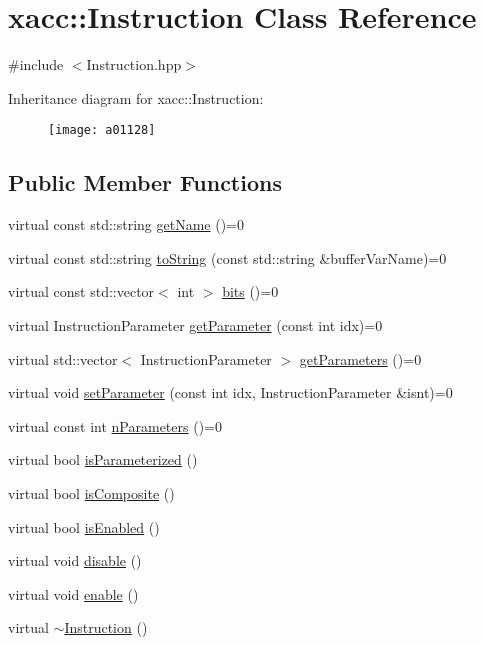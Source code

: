 \hypertarget{a01128}{}\section{xacc\+:\+:Instruction Class Reference}
\label{a01128}


{\ttfamily \#include $<$Instruction.\+hpp$>$}

Inheritance diagram for xacc\+:\+:Instruction\+:\begin{figure}[H]
\begin{center}
\leavevmode
\texttt{[image: a01128]}
\end{center}
\end{figure}
\subsection*{Public Member Functions}
\begin{DoxyCompactItemize}
\item 
virtual const std\+::string \hyperlink{a01128_ac7ff23f693e2276edbf3fdac5452792c}{get\+Name} ()=0
\item 
virtual const std\+::string \hyperlink{a01128_ae94c2d089908294c1d410b14c96817ae}{to\+String} (const std\+::string \&buffer\+Var\+Name)=0
\item 
virtual const std\+::vector$<$ int $>$ \hyperlink{a01128_a819f32e94c3e1c9e69a0061aaf8d86dc}{bits} ()=0
\item 
virtual Instruction\+Parameter \hyperlink{a01128_aa0d9de97a4833a042379647f83c33ab6}{get\+Parameter} (const int idx)=0
\item 
virtual std\+::vector$<$ Instruction\+Parameter $>$ \hyperlink{a01128_aeb67c67713896e8f27a5c7dd531f3340}{get\+Parameters} ()=0
\item 
virtual void \hyperlink{a01128_a407a0ac662fa0b1ec3e301e8ff9bade7}{set\+Parameter} (const int idx, Instruction\+Parameter \&isnt)=0
\item 
virtual const int \hyperlink{a01128_ad54585d13c04ffd20296fff7ab8107ff}{n\+Parameters} ()=0
\item 
virtual bool \hyperlink{a01128_a7b24d8ae485369fc2b2df7a3224a5e26}{is\+Parameterized} ()
\item 
virtual bool \hyperlink{a01128_a4383f1036d0fcfe890ab9c613dbd5f38}{is\+Composite} ()
\item 
virtual bool \hyperlink{a01128_ad02a1cf7220577124720b7a51424cea7}{is\+Enabled} ()
\item 
virtual void \hyperlink{a01128_a6e528da15e05a94cc1d7db268c483271}{disable} ()
\item 
virtual void \hyperlink{a01128_a0b4f2e5a591af28342a3c08e4305e24f}{enable} ()
\item 
virtual \hyperlink{a01128_ae22c935e8113bce63d1d0e214cda4d61}{$\sim$\+Instruction} ()
\end{DoxyCompactItemize}
